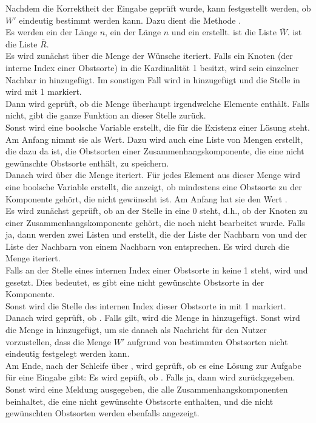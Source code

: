Nachdem die Korrektheit der Eingabe geprüft wurde, kann festgestellt werden, ob $W'$ eindeutig
bestimmt werden kann. Dazu dient die Methode .\\
Es werden ein  der Länge $n$, ein  der Länge $n$ und 
ein  erstellt.
 ist die Liste $\bar{W}$.  ist die Liste $\bar{R}$.\\
Es wird zunächst über die Menge der Wünsche  iteriert. 
Falls ein Knoten  (der interne Index einer Obstsorte) in 
die Kardinalität 1 besitzt, wird sein einzelner
Nachbar in  hinzugefügt.
Im sonstigen Fall wird  in  hinzugefügt und die Stelle  in 
wird mit 1 markiert.\\
Dann wird geprüft, ob die Menge  überhaupt irgendwelche Elemente enthält.
Falls nicht, gibt die ganze Funktion an dieser Stelle  zurück.\\
Sonst wird eine boolsche Variable  erstellt, die für die Existenz einer Lösung steht.
Am Anfang nimmt sie  als Wert. 
Dazu wird auch eine Liste von Mengen  erstellt, die dazu da ist,
die Obstsorten einer Zusammenhangskomponente, die eine nicht gewünschte Obstsorte enthält, zu speichern.\\
Danach wird über die Menge  iteriert. 
Für jedes Element  aus dieser Menge wird eine boolsche Variable  erstellt, die 
anzeigt, ob mindestens eine Obstsorte zu der Komponente gehört, die nicht gewünscht ist.
Am Anfang hat sie den Wert .\\
Es wird zunächst geprüft, ob an der Stelle  in  eine 0 steht, d.h.,
ob der Knoten zu einer Zusammenhangskomponente gehört, die noch nicht bearbeitet wurde.
Falls ja, dann werden zwei Listen  und  erstellt,
die der Liste der Nachbarn von  und der Liste der Nachbarn von einem Nachbarn von 
entsprechen.
Es wird durch die Menge  iteriert.\\
Falls an der Stelle eines internen Index
einer Obstsorte in  keine 1 steht, wird  und  gesetzt.
Dies bedeutet, es gibt eine nicht gewünschte Obstsorte in der Komponente.\\
Sonst wird die Stelle des internen Index dieser Obstsorte in  mit 1 markiert.\\
Danach wird geprüft, ob . Falls  gilt, wird die Menge 
in  hinzugefügt. Sonst wird die Menge  in  hinzugefügt, um sie 
danach als Nachricht für den Nutzer vorzustellen, dass 
die Menge $W'$ aufgrund von bestimmten Obstsorten nicht eindeutig festgelegt werden kann.\\
Am Ende, nach der Schleife über , wird geprüft, ob es eine Lösung zur Aufgabe für eine
Eingabe gibt: Es wird gepüft, ob . Falls ja, dann wird  zurückgegeben.
Sonst wird eine Meldung ausgegeben, die alle Zusammenhangskomponenten beinhaltet, 
die eine nicht gewünschte Obstsorte enthalten, und die nicht gewünschten Obstsorten werden
ebenfalls angezeigt.
